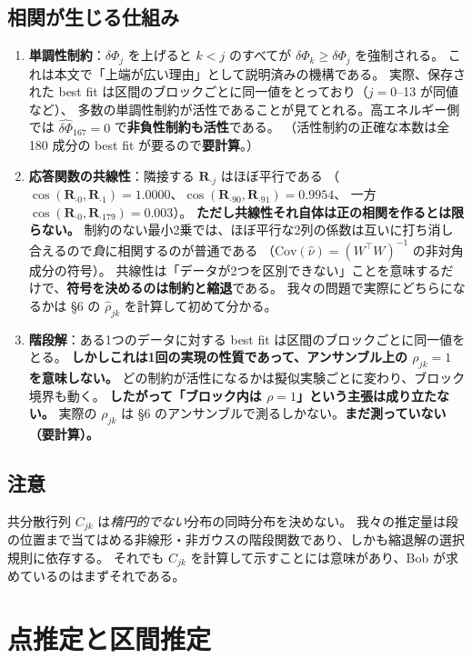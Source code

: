 \documentclass[11pt,a4paper]{ltjsarticle}
\newcommand{\dP}{\delta\Phi}
\newcommand{\dPh}{\widehat{\delta\Phi}}
\newcommand{\Cov}{\mathrm{Cov}}
\begin{document}
\subsection{相関が生じる仕組み}
\begin{enumerate}\itemsep3pt
\item \textbf{単調性制約}：$\dP_j$ を上げると $k<j$ のすべてが $\dP_k\ge\dP_j$ を強制される。
これは本文で「上端が広い理由」として説明済みの機構である。
実際、保存された best fit は区間のブロックごとに同一値をとっており（$j=0$--13 が同値など）、
多数の単調性制約が活性であることが見てとれる。高エネルギー側では $\dPh_{167}=0$ で\textbf{非負性制約も活性}である。
（活性制約の正確な本数は全 180 成分の best fit が要るので\textbf{要計算}。）
\item \textbf{応答関数の共線性}：隣接する $\bm R_{\cdot j}$ はほぼ平行である
（$\cos(\bm R_{\cdot0},\bm R_{\cdot1})=1.0000$、$\cos(\bm R_{\cdot90},\bm R_{\cdot91})=0.9954$、
一方 $\cos(\bm R_{\cdot0},\bm R_{\cdot179})=0.003$）。
\textbf{ただし共線性それ自体は正の相関を作るとは限らない。}
制約のない最小2乗では、ほぼ平行な2列の係数は互いに打ち消し合えるので\emph{負}に相関するのが普通である
（$\Cov(\hat\nu)=(W^{\!\top}W)^{-1}$ の非対角成分の符号）。
共線性は「データが2つを区別できない」ことを意味するだけで、\textbf{符号を決めるのは制約と縮退}である。
我々の問題で実際にどちらになるかは \S6 の $\hat\rho_{jk}$ を計算して初めて分かる。
\item \textbf{階段解}：ある1つのデータに対する best fit は区間のブロックごとに同一値をとる。
\textbf{しかしこれは1回の実現の性質であって、アンサンブル上の $\rho_{jk}=1$ を意味しない。}
どの制約が活性になるかは擬似実験ごとに変わり、ブロック境界も動く。
\textbf{したがって「ブロック内は $\rho=1$」という主張は成り立たない。}
実際の $\rho_{jk}$ は \S6 のアンサンブルで測るしかない。\textbf{まだ測っていない（要計算）。}
\end{enumerate}

\subsection{注意}
共分散行列 $C_{jk}$ は\emph{楕円的でない}分布の同時分布を決めない。
我々の推定量は段の位置まで当てはめる非線形・非ガウスの階段関数であり、しかも縮退解の選択規則に依存する。
それでも $C_{jk}$ を計算して示すことには意味があり、Bob が求めているのはまずそれである。

\section{点推定と区間推定}
\end{document}
